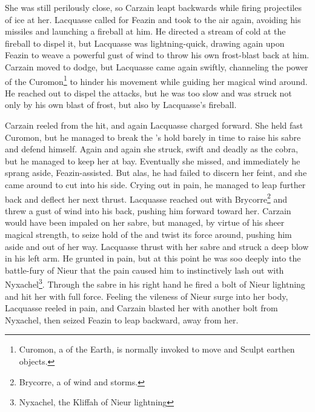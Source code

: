 \documentclass[a4paper,10pt,openany,oneside]{article}
\begin{document}
She was still perilously close, so Carzain leapt backwards while firing projectiles of ice at her. Lacquasse called for Feazin and took to the air again, avoiding his missiles and launching a fireball at him. He directed a stream of cold at the fireball to dispel it, but Lacquasse was lightning-quick, drawing again upon Feazin to weave a powerful gust of wind to throw his own frost-blast back at him. Carzain moved to dodge, but Lacquasse came again swiftly, channeling the power of the \Sephirah{} Curomon\footnote{Curomon, a \Sephirah{} of the Earth, is normally invoked to move and Sculpt earthen objects.} to hinder his movement while guiding her magical wind around. He reached out to dispel the attacks, but he was too slow and was struck not only by his own blast of frost, but also by Lacquasse's fireball. 

Carzain reeled from the hit, and again Lacquasse charged forward. She held fast Curomon, but he managed to break the \Sephirah{}'s hold barely in time to raise his sabre and defend himself. Again and again she struck, swift and deadly as the cobra, but he managed to keep her at bay. Eventually she missed, and immediately he sprang aside, Feazin-assisted. But alas, he had failed to discern her feint, and she came around to cut into his side. Crying out in pain, he managed to leap further back and deflect her next thrust. Lacquasse reached out with Brycorre\footnote{Brycorre, a \Sephirah{} of wind and storms.} and threw a gust of wind into his back, pushing him forward toward her. Carzain would have been impaled on her sabre, but managed, by virtue of his sheer magical strength, to seize hold of the \Sephirah{} and twist its force around, pushing him aside and out of her way. Lacquasse thrust with her sabre and struck a deep blow in his left arm. He grunted in pain, but at this point he was soo deeply into the battle-fury of Nieur that the pain caused him to instinctively lash out with Nyxachel\footnote{Nyxachel, the Kliffah of Nieur lightning}. Through the sabre in his right hand he fired a bolt of Nieur lightning and hit her with full force. Feeling the vileness of Nieur surge into her body, Lacquasse reeled in pain, and Carzain blasted her with another bolt from Nyxachel, then seized Feazin to leap backward, away from her. 
\end{document}
